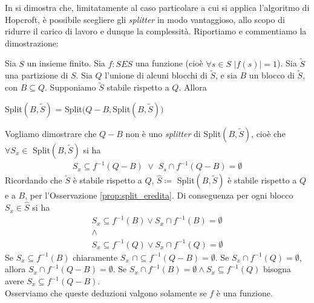 In \cite{paigetarjan} si dimostra che, limitatamente al caso particolare a cui si applica l'algoritmo di Hopcroft, è possibile scegliere gli \emph{splitter} in modo vantaggioso, allo scopo di ridurre il carico di lavoro e dunque la complessità. Riportiamo e commentiamo la dimostrazione:
\begin{proposition}
    Sia $S$ un insieme finito. Sia $f : S E S$ una funzione (cioè $\forall s \in S\,\, |f({s})| = 1$). Sia $\widetilde{S}$ una partizione di $S$. Sia $Q$ l'unione di alcuni blocchi di $\widetilde{S}$, e sia $B$ un blocco di $\widetilde{S}$, con $B \subseteq Q$. Supponiamo $\widetilde{S}$ stabile rispetto a $Q$. Allora
    \begin{center}
        Split$(B,\widetilde{S})$ = Split$(Q - B, $Split$(B,\widetilde{S}))$
    \end{center}
\end{proposition}
\begin{proof2}
    Vogliamo dimostrare che $Q - B$ non è uno \emph{splitter} di Split$(B,\widetilde{S})$, cioè che $\forall S_x \in $ Split$(B,\widetilde{S})$ si ha
    \begin{gather*}
        S_x \subseteq f^{-1}(Q - B) \,\,\lor\,\, S_s \cap f^{-1}(Q-B) = \emptyset
    \end{gather*}
    Ricordando che $\widetilde{S}$ è stabile rispetto a $Q$, $\widehat{S} \coloneqq$ Split$(B,\widetilde{S})$ è stabile rispetto a $Q$ e a $B$, per l'Osservazione \ref{prop:split_eredita}. Di conseguenza per ogni blocco $S_x \in \widehat{S}$ si ha
    \begin{gather*}
        S_x \subseteq f^{-1}(B) \lor S_x \cap f^{-1}(B) = \emptyset\\
        \land\\
        S_x \subseteq f^{-1}(Q) \lor S_x \cap f^{-1}(Q) = \emptyset
    \end{gather*}
    Se $S_x \subseteq f^{-1}(B)$ chiaramente $S_x \,\,\cap \subseteq f^{-1}(Q-B) = \emptyset$. Se $S_x \cap f^{-1}(Q) = \emptyset$, allora $S_x \cap f^{-1}(Q-B) = \emptyset$. Se $S_x \cap f^{-1}(B) = \emptyset \land S_x \subseteq f^{-1}(Q)$ bisogna avere $S_x \subseteq f^{-1}(Q-B)$.\\
    Osserviamo che queste deduzioni valgono solamente se $f$ è una funzione.
\end{proof2}

